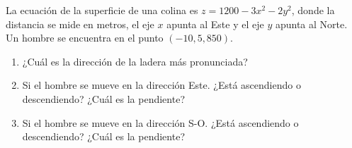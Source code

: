\documentclass[a4,11pt]{aleph-notas}
\begin{document}
\begin{ejer}
La ecuación de la superficie de una colina es $z = 1200 - 3x^2 - 2y^2$, donde la distancia se mide en metros, el eje $x$ apunta al Este y el eje $y$ apunta al Norte. Un hombre se encuentra en el punto $(-10, 5, 850)$.
    \begin{enumerate}
        \item ¿Cuál es la dirección de la ladera más pronunciada?
        \item Si el hombre se mueve en la dirección Este. ¿Está ascendiendo o descendiendo? ¿Cuál es la pendiente?
        \item Si el hombre se mueve en la dirección S-O. ¿Está ascendiendo o descendiendo? ¿Cuál es la pendiente?
    \end{enumerate}
\end{ejer}
\end{document}
